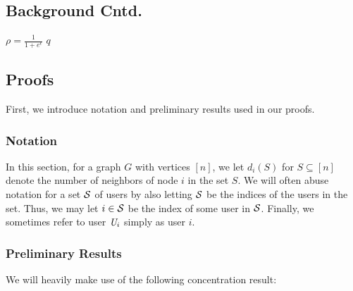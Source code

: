 \graphicspath{{./chapters/chapter4/}}
\chapter{ }

\section{Background Cntd.}\label{app:background}


\setlength{\textfloatsep}{2pt}
%  
\begin{algorithm}
  $\rho=\frac{1}{1+e^{\epsilon}}$\;
  \KwRet $q$
  \caption{$\rr_\rho: \{0,1\}^n\mapsto\{0,1\}^n$ }\label{alg:rr}
\end{algorithm}

\section{Proofs}\label{app:proofs}
First, we introduce notation and preliminary results used in our proofs.
\subsection{Notation} In this section, for a graph $G$ with vertices $[n]$, we let $d_i(S)$ for $S \subseteq [n]$ denote the number of neighbors of node $i$ in the set $S$.
We will often abuse notation for a set $\mathcal{S}$ of users by also letting $\mathcal{S}$ be the indices of the users in the set. Thus, we may let $i \in \mathcal{S}$ be the index of some user in $\mathcal{S}$.
Finally, we sometimes refer to user $\textit{U}_i$ simply as user $i$.

\subsection{Preliminary Results}
We will heavily make use of the following concentration result:

